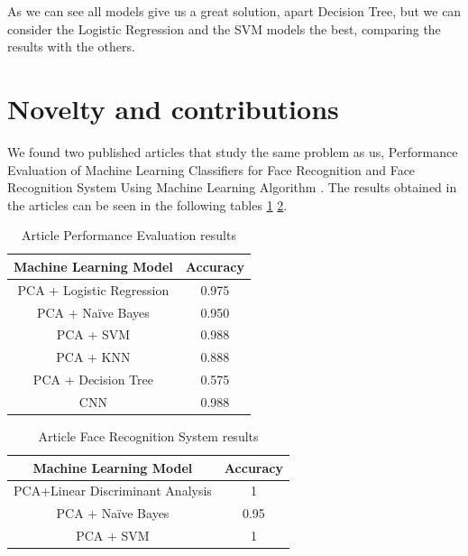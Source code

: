 \documentclass[conference]{IEEEtran}
\begin{document}
As we can see all models give us a great solution, apart Decision Tree, but we can consider the Logistic Regression and the SVM models the best, comparing the results with the others.

\section{Novelty and contributions}

We found two published articles that study the same problem as us, Performance Evaluation of Machine Learning Classifiers for Face Recognition \cite{9716171} and Face Recognition System Using Machine Learning Algorithm \cite{9137850}. The results obtained in the articles can be seen in the following tables \ref{tab:tab_performance_evaluation_article} \ref{tab:tab_Face_Recognition_System_article}.

\begin{table}[ht!]
    \centering
    \caption{Article Performance Evaluation results} 
    \begin{tabular}{||c| c ||} 
    \hline
     Machine Learning Model & Accuracy \\ [0.5ex] 
     \hline\hline
     PCA + Logistic Regression & 0.975 \\
     \hline
    PCA + Naïve Bayes & 0.950 \\ 
    \hline
    PCA + SVM & 0.988 \\ 
    \hline
    PCA + KNN & 0.888 \\ 
    \hline
    PCA + Decision Tree & 0.575\\ 
    \hline
    CNN & 0.988\\ 
    \hline
    \end{tabular}
    \label{tab:tab_performance_evaluation_article}
\end{table}

\begin{table}[ht!]
    \centering
    \caption{Article Face Recognition System results} 
    \begin{tabular}{||c| c ||} 
    \hline
     Machine Learning Model & Accuracy \\ [0.5ex] 
     \hline\hline
     PCA+Linear Discriminant Analysis & 1 \\
     \hline
    PCA + Naïve Bayes & 0.95 \\ 
    \hline
    PCA + SVM & 1 \\ 
    \hline
    \end{tabular}
    \label{tab:tab_Face_Recognition_System_article}
\end{table}
\end{document}
